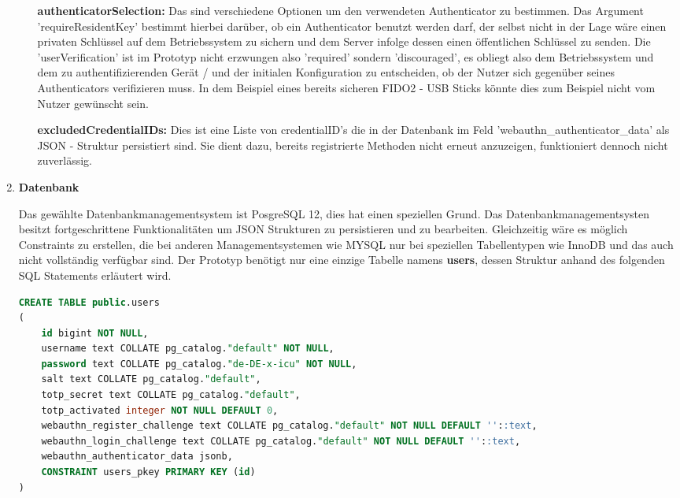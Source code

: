 \begin{enumerate}
\begin{itemize}
\textbf{authenticatorSelection:} Das sind verschiedene Optionen um den verwendeten Authenticator zu bestimmen. Das Argument 'requireResidentKey' bestimmt hierbei darüber, ob ein Authenticator benutzt werden darf, der selbst nicht in der Lage wäre einen privaten Schlüssel auf dem Betriebssystem zu sichern und dem Server infolge dessen einen öffentlichen Schlüssel zu senden. Die 'userVerification' ist im Prototyp nicht erzwungen also 'required' sondern 'discouraged', es obliegt also dem Betriebssystem und dem zu authentifizierenden Gerät / und der initialen Konfiguration zu entscheiden, ob der Nutzer sich gegenüber seines Authenticators verifizieren muss. In dem Beispiel eines bereits sicheren FIDO2 - USB Sticks könnte dies zum Beispiel nicht vom Nutzer gewünscht sein.

\textbf{excludedCredentialIDs:} Dies ist eine Liste von credentialID's die in der Datenbank im Feld 'webauthn\_authenticator\_data' als JSON - Struktur persistiert sind. Sie dient dazu, bereits registrierte Methoden nicht erneut anzuzeigen, funktioniert dennoch nicht zuverlässig.
\end{itemize}
\newpage

\item \textbf{Datenbank}

Das gewählte Datenbankmanagementsystem ist PosgreSQL 12, dies hat einen speziellen Grund. Das Datenbankmanagementsysten besitzt fortgeschrittene Funktionalitäten um JSON Strukturen zu persistieren und zu bearbeiten. Gleichzeitig wäre es möglich Constraints zu erstellen, die bei anderen Managementsystemen wie MYSQL nur bei speziellen Tabellentypen wie InnoDB und das auch nicht vollständig verfügbar sind. Der Prototyp benötigt nur eine einzige Tabelle namens \textbf{users}, dessen Struktur anhand des folgenden SQL Statements erläutert wird.\\

 \begin{lstlisting}[language=sql,firstnumber=1]
CREATE TABLE public.users
(
    id bigint NOT NULL,
    username text COLLATE pg_catalog."default" NOT NULL,
    password text COLLATE pg_catalog."de-DE-x-icu" NOT NULL,
    salt text COLLATE pg_catalog."default",
    totp_secret text COLLATE pg_catalog."default",
    totp_activated integer NOT NULL DEFAULT 0,
    webauthn_register_challenge text COLLATE pg_catalog."default" NOT NULL DEFAULT ''::text,
    webauthn_login_challenge text COLLATE pg_catalog."default" NOT NULL DEFAULT ''::text,
    webauthn_authenticator_data jsonb,
    CONSTRAINT users_pkey PRIMARY KEY (id)
)
\end{lstlisting}


\end{enumerate}
